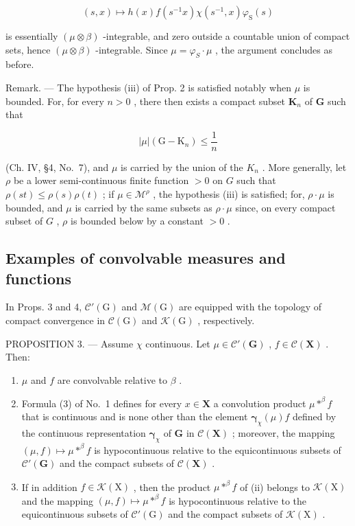 \[
(s, x) \mapsto h (x) f (s ^ {- 1} x) \chi (s ^ {- 1}, x) \varphi_ {\mathrm{S}} (s)
\]

is essentially \((\mu\otimes\beta)\) -integrable, and zero outside a countable union of compact sets, hence \((\mu\otimes\beta)\) -integrable. Since \(\mu=\varphi_{S}\cdot\mu\) , the argument concludes as before.

Remark. --- The hypothesis (iii) of Prop. 2 is satisfied notably when \(\mu\) is bounded. For, for every \(n > 0\) , there then exists a compact subset \(\mathbf{K}_n\) of \(\mathbf{G}\) such that

\[
| \mu | (\mathrm{G} - \mathrm{K} _ {n}) \leqslant \frac {1}{n}
\]

(Ch. IV, §4, No.~7), and \(\mu\) is carried by the union of the \(K_{n}\) . More generally, let \(\rho\) be a lower semi-continuous finite function \(>0\) on \(G\) such that \(\rho(st) \leqslant \rho(s)\rho(t)\) ; if \(\mu \in \mathcal{M}^{\rho}\) , the hypothesis (iii) is satisfied; for, \(\rho \cdot \mu\) is bounded, and \(\mu\) is carried by the same subsets as \(\rho \cdot \mu\) since, on every compact subset of \(G\) , \(\rho\) is bounded below by a constant \(>0\) .

\subsection{Examples of convolvable measures and functions}

In Props. 3 and 4, \(\mathcal{C}'(\mathrm{G})\) and \(\mathcal{M}(\mathrm{G})\) are equipped with the topology of compact convergence in \(\mathcal{C}(\mathrm{G})\) and \(\mathcal{K}(\mathrm{G})\) , respectively.

PROPOSITION 3. --- Assume \(\chi\) continuous. Let \(\mu \in \mathcal{C}'(\mathbf{G})\) , \(f \in \mathcal{C}(\mathbf{X})\) . Then:

\begin{enumerate}
\def\labelenumi{(\roman{enumi})}
\item
  \(\mu\) and \(f\) are convolvable relative to \(\beta\) .
\item
  Formula (3) of No.~1 defines for every \(x \in \mathbf{X}\) a convolution product \(\mu *^{\beta}f\) that is continuous and is none other than the element \(\pmb{\gamma}_{\chi}(\mu)f\) defined by the continuous representation \(\pmb{\gamma}_{\chi}\) of \(\mathbf{G}\) in \(\mathcal{C}(\mathbf{X})\) ; moreover, the mapping \((\mu, f) \mapsto \mu *^{\beta}f\) is hypocontinuous relative to the equicontinuous subsets of \(\mathcal{C}'(\mathbf{G})\) and the compact subsets of \(\mathcal{C}(\mathbf{X})\) .
\item
  If in addition \(f \in \mathcal{K}(\mathrm{X})\) , then the product \(\mu *^{\beta}f\) of (ii) belongs to \(\mathcal{K}(\mathrm{X})\) and the mapping \((\mu, f) \mapsto \mu *^{\beta}f\) is hypocontinuous relative to the equicontinuous subsets of \(\mathcal{C}'(\mathrm{G})\) and the compact subsets of \(\mathcal{K}(\mathrm{X})\) .
\end{enumerate}

